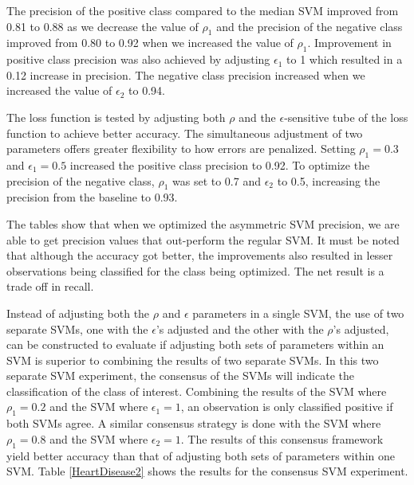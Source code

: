 \documentclass[twoside,11pt]{article}
\begin{document}
The precision of the positive class compared to the median SVM improved from 0.81 to 0.88 as we decrease the value of $\rho_1$ and the precision of the negative class improved from 0.80 to 0.92 when we increased the value of $\rho_1$. Improvement in positive class precision was also achieved by adjusting $\epsilon_1$ to 1 which resulted in a 0.12 increase in precision. The negative class precision increased when we increased the value of $\epsilon_2$ to 0.94. 


The loss function is tested by adjusting both $\rho$ and the $\epsilon$-sensitive tube of the loss function to achieve better accuracy. The simultaneous adjustment of two parameters offers greater flexibility to how errors are penalized. Setting $\rho_1=0.3$ and $\epsilon_1=0.5$ increased the positive class precision to 0.92. To optimize the precision of the negative class, $\rho_1$ was set to 0.7 and $\epsilon_2$ to 0.5, increasing the precision from the baseline to 0.93. 

The tables show that when we optimized the asymmetric SVM precision, we are able to get precision values that out-perform the regular SVM. It must be noted that although the accuracy got better, the improvements also resulted in lesser observations being classified for the class being optimized. The net result is a trade off in recall. 

Instead of adjusting both the $\rho$ and $\epsilon$ parameters in a single SVM, the use of two separate SVMs, one with the $\epsilon$'s adjusted and the other with the $\rho$'s adjusted, can be constructed to evaluate if adjusting both sets of parameters within an SVM is superior to combining the results of two separate SVMs. In this two separate SVM experiment, the consensus of the SVMs will indicate the classification of the class of interest. Combining the results of the SVM where $\rho_1=0.2$ and the SVM where $\epsilon_1=1$, an observation is only classified positive if both SVMs agree. A similar consensus strategy is done with the SVM where $\rho_1=0.8$ and the SVM where $\epsilon_2=1$. The results of this consensus framework yield better accuracy than that of adjusting both sets of parameters within one SVM. Table \ref{HeartDisease2} shows the results for the consensus SVM experiment. 
\end{document}
